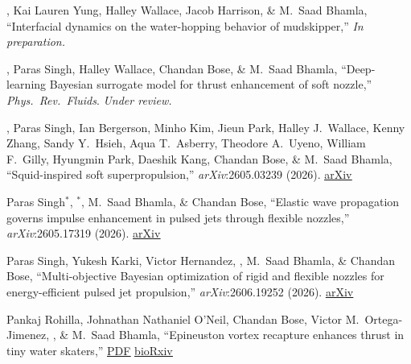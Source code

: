 \begin{pubSubsectionNum}


  \item \daehyunchoi, Kai Lauren Yung, Halley Wallace, Jacob Harrison, \& M.\ Saad Bhamla,
        ``Interfacial dynamics on the water-hopping behavior of mudskipper,''
        \textcolor{BrickRed}{\textit{In preparation.}}

  \item \daehyunchoi, Paras Singh, Halley Wallace, Chandan Bose, \& M.\ Saad Bhamla,
        ``Deep-learning Bayesian surrogate model for thrust enhancement of soft nozzle,''
        \textit{Phys.\ Rev.\ Fluids}. \textcolor{BrickRed}{\textit{Under review.}}


  \item \daehyunchoi, Paras Singh, Ian Bergerson, Minho Kim, Jieun Park,
        Halley J.\ Wallace, Kenny Zhang, Sandy Y.\ Hsieh, Aqua T.\ Asberry,
        Theodore A.\ Uyeno, William F.\ Gilly, Hyungmin Park, Daeshik Kang,
        Chandan Bose, \& M.\ Saad Bhamla,
        ``Squid-inspired soft superpropulsion,''
        \textit{arXiv}:2605.03239 (2026).
        \underreview
        \ifshowcontent\href{https://arxiv.org/abs/2605.03239}{\underline{arXiv}}\fi

  \item Paras Singh$^\ast$, \daehyunchoi$^\ast$, M.\ Saad Bhamla, \& Chandan Bose,
        ``Elastic wave propagation governs impulse enhancement in pulsed jets
        through flexible nozzles,''
        \textit{arXiv}:2605.17319 (2026).
        \underreview
        \ifshowcontent\href{https://arxiv.org/abs/2605.17319}{\underline{arXiv}}\fi

  \item Paras Singh, Yukesh Karki, Victor Hernandez, \daehyunchoi,
        M.\ Saad Bhamla, \& Chandan Bose,
        ``Multi-objective Bayesian optimization of rigid and flexible nozzles
        for energy-efficient pulsed jet propulsion,''
        \textit{arXiv}:2606.19252 (2026).
        \underreview
        \ifshowcontent\href{https://arxiv.org/abs/2606.19252}{\underline{arXiv}}\fi

  \item Pankaj Rohilla, Johnathan Nathaniel O'Neil, Chandan Bose,
        Victor M.\ Ortega-Jimenez, \daehyunchoi, \& M.\ Saad Bhamla,
        ``Epineuston vortex recapture enhances thrust in tiny water skaters,''
        \underreview
        \ifshowcontent
          \href{https://dae416.github.io/papers/rohilla2024_biorxiv.pdf}{\underline{PDF}} \href{https://doi.org/10.1101/2024.06.17.599397}{\underline{bioRxiv}}
        \fi


\end{pubSubsectionNum}

